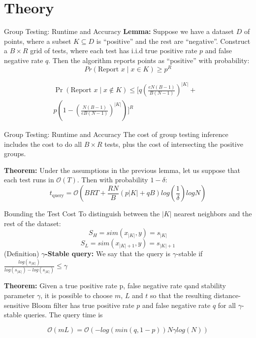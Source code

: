 \documentclass[Serif, 10pt, brown]{beamer}
\theoremstyle{example}
\theoremstyle{plain}
\begin{document}
\section{Theory}
\begin{frame}{Group Testing: Runtime and Accuracy}
\textbf{Lemma:} Suppose we have a dataset $D$ of points, where a subset $K \subseteq D$ is ``positive'' and the rest are ``negative''. Construct a $B \times R$ grid of tests, where each test has i.i.d true positive rate $p$ and false negative rate $q$. Then the algorithm reports points as ``positive''	with probability:
\[
Pr(\text{Report } x \mid x \in K) \geq p^R
\]

\[
\begin{aligned}
\Pr(\text{Report } x \mid x \notin K) \leq 
\bigg[ q\left(\frac{eN(B-1)}{B(N-1)}\right)^{|K|} 
+ {} & \\
p\left(1 - \left(\frac{N(B-1)}{eB(N-1)}\right)^{|K|}\right) \bigg]^R &
\end{aligned}
\]
\end{frame}

\begin{frame}{Group Testing: Runtime and Accuracy}
	The cost of group testing inference includes the cost to do all $B \times R$ tests, plus the cost of intersecting the positive groups. 

	\textbf{Theorem:} Under the assumptions in the previous lemma, let us suppose that each test runs in $\mathcal{O}(T)$. Then with probability $1 - \delta$:
	\[
	t_{\text{query}} = \mathcal{O}\left(BRT + \frac{RN}{B}(p|K| + qB)log(\frac{1}{\delta})logN\right)
	\]
\end{frame}

\begin{frame}{Bounding the Test Cost}
	To distinguish between the $|K|$ nearest neighbors and the rest of the dataset:
	\[S_H = sim(x_{|K|}, y) = s_{|K|}\]
	\[S_L = sim(x_{|K| + 1}, y) = s_{|K| + 1}\]
	(Definition) $\gamma${\bf -Stable query:} We say that the query is $\gamma$-stable if $\frac{log(s_{|K|})}{log(s_{|K|}) - log(s_{|K|})} \leq \gamma$

	\vspace{0.5cm}
	\textbf{Theorem:} Given a true positive rate p, false negative rate qand stability parameter $\gamma$, it is possible to choose $m$, $L$ and $t$ so that the resulting distance-sensitive Bloom filter has true positive rate $p$ and false negative rate $q$ for all $\gamma$-stable queries. The query time is

	\[\mathcal{O}(mL) = \mathcal{O}(-log(min(q,1-p))N\gamma log(N))\]

\end{frame}
\end{document}
